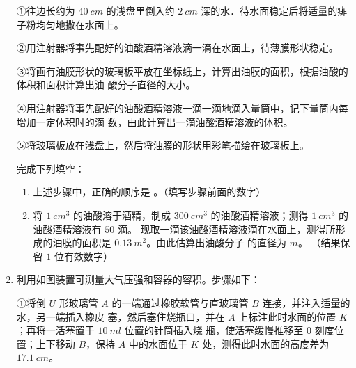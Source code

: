 \begin{enumerate}
①往边长约为 $ 40 \ cm $ 的浅盘里倒入约 $ 2 \ cm $ 深的水．待水面稳定后将适量的痱子粉均匀地撒在水面上。

②用注射器将事先配好的油酸酒精溶液滴一滴在水面上，待薄膜形状稳定。

③将画有油膜形状的玻璃板平放在坐标纸上，计算出油膜的面积，根据油酸的体积和面积计算出油
酸分子直径的大小。

④用注射器将事先配好的油酸酒精溶液一滴一滴地滴入量筒中，记下量筒内每增加一定体积时的滴
数，由此计算出一滴油酸酒精溶液的体积。

⑤将玻璃板放在浅盘上，然后将油膜的形状用彩笔描绘在玻璃板上。


完成下列填空：
\begin{enumerate}
	\item
上述步骤中，正确的顺序是 \underlinegap 。（填写步骤前面的数字）


\item 
将 $ 1 \ cm^{3} $ 的油酸溶于酒精，制成 $ 300 \ cm^{3} $ 的油酸酒精溶液；测得 $ 1 \ cm^{3} $ 的油酸酒精溶液有 $ 50 $ 滴。
现取一滴该油酸酒精溶液滴在水面上，测得所形成的油膜的面积是 $ 0.13 \ m^{2} $。由此估算出油酸分子
的直径为 \underlinegap $ m $。
（结果保留 $ 1 $ 位有效数字）

	
\end{enumerate}




\item 
{}
利用如图装置可测量大气压强和容器的容积。步骤如下：

①将倒 $ U $ 形玻璃管 $ A $ 的一端通过橡胶软管与直玻璃管 $ B $ 连接，并注入适量的水，另一端插入橡皮
塞，然后塞住烧瓶口，并在 $ A $ 上标注此时水面的位置 $ K $；再将一活塞置于 $ 10 \ m l $ 位置的针筒插入烧
瓶，使活塞缓慢推移至 $ 0 $ 刻度位置；上下移动 $ B $，保持 $ A $ 中的水面位于 $ K $
处，测得此时水面的高度差为 $ 17.1 \ cm $。




\end{enumerate}
